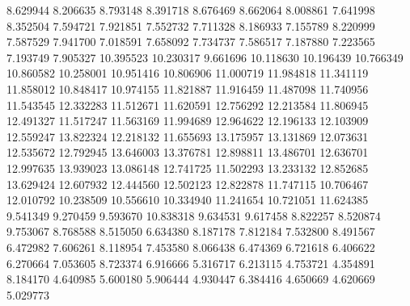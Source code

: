 8.629944
8.206635
8.793148
8.391718
8.676469
8.662064
8.008861
7.641998
8.352504
7.594721
7.921851
7.552732
7.711328
8.186933
7.155789
8.220999
7.587529
7.941700
7.018591
7.658092
7.734737
7.586517
7.187880
7.223565
7.193749
7.905327
10.395523
10.230317
9.661696
10.118630
10.196439
10.766349
10.860582
10.258001
10.951416
10.806906
11.000719
11.984818
11.341119
11.858012
10.848417
10.974155
11.821887
11.916459
11.487098
11.740956
11.543545
12.332283
11.512671
11.620591
12.756292
12.213584
11.806945
12.491327
11.517247
11.563169
11.994689
12.964622
12.196133
12.103909
12.559247
13.822324
12.218132
11.655693
13.175957
13.131869
12.073631
12.535672
12.792945
13.646003
13.376781
12.898811
13.486701
12.636701
12.997635
13.939023
13.086148
12.741725
11.502293
13.233132
12.852685
13.629424
12.607932
12.444560
12.502123
12.822878
11.747115
10.706467
12.010792
10.238509
10.556610
10.334940
11.241654
10.721051
11.624385
9.541349
9.270459
9.593670
10.838318
9.634531
9.617458
8.822257
8.520874
9.753067
8.768588
8.515050
6.634380
8.187178
7.812184
7.532800
8.491567
6.472982
7.606261
8.118954
7.453580
8.066438
6.474369
6.721618
6.406622
6.270664
7.053605
8.723374
6.916666
5.316717
6.213115
4.753721
4.354891
8.184170
4.640985
5.600180
5.906444
4.930447
6.384416
4.650669
4.620669
5.029773
